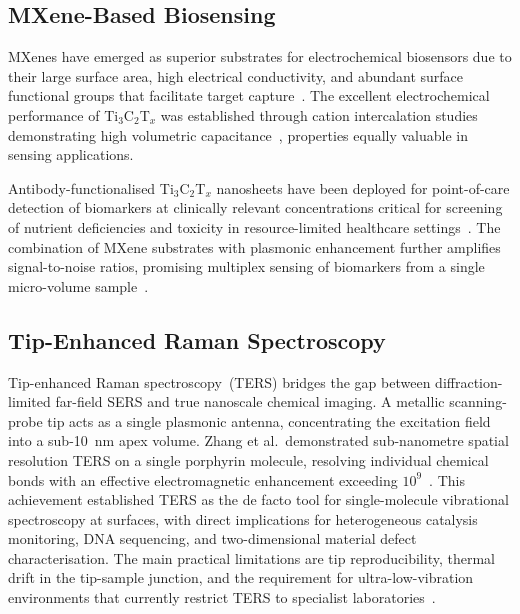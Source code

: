 \documentclass[twocolumn,10pt]{article}
\begin{document}
\subsection{MXene-Based Biosensing}

MXenes have emerged as superior substrates for electrochemical biosensors
due to their large surface area, high electrical conductivity, and
abundant surface functional groups that facilitate target
capture~\cite{gogotsi2019rise}.  The excellent electrochemical
performance of Ti$_3$C$_2$T$_x$ was established through cation
intercalation studies demonstrating high volumetric
capacitance~\cite{lukatskaya2013cation}, properties equally valuable in
sensing applications.

Antibody-functionalised Ti$_3$C$_2$T$_x$ nanosheets have been deployed
for point-of-care detection of biomarkers at clinically relevant
concentrations critical for screening of nutrient deficiencies and
toxicity in resource-limited healthcare
settings~\cite{anasori2017mxenes,kim2019wearable}.  The combination of
MXene substrates with plasmonic enhancement further amplifies
signal-to-noise ratios, promising multiplex sensing of biomarkers from a
single micro-volume sample~\cite{gogotsi2019rise}.

\subsection{Tip-Enhanced Raman Spectroscopy}

Tip-enhanced Raman spectroscopy~(TERS) bridges the gap between diffraction-
limited far-field SERS and true nanoscale chemical imaging.  A metallic
scanning-probe tip acts as a single plasmonic antenna, concentrating the
excitation field into a sub-10~nm apex volume.  Zhang et al.\ demonstrated
sub-nanometre spatial resolution TERS on a single porphyrin molecule,
resolving individual chemical bonds with an effective electromagnetic
enhancement exceeding $10^9$~\cite{zhang2013chemically}.  This achievement
established TERS as the de facto tool for single-molecule vibrational
spectroscopy at surfaces, with direct implications for
heterogeneous catalysis monitoring, DNA sequencing, and two-dimensional
material defect characterisation.  The main practical limitations are
tip reproducibility, thermal drift in the tip-sample junction, and
the requirement for ultra-low-vibration environments that currently
restrict TERS to specialist laboratories~\cite{zhang2013chemically,ding2016nanostructure}.

\end{document}
